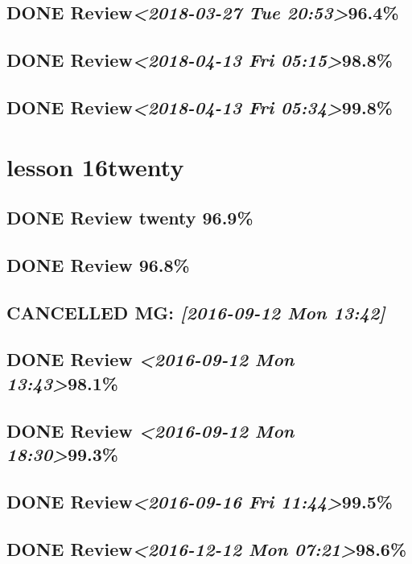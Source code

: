 \documentclass[11pt]{ctexart}
\begin{document}
\subsection{{\bfseries\sffamily DONE} Review\textit{<2018-03-27 Tue 20:53>}96.4\%}
\label{sec:org4cd9278}
\subsection{{\bfseries\sffamily DONE} Review\textit{<2018-04-13 Fri 05:15>}98.8\%}
\label{sec:org86f1db8}
\subsection{{\bfseries\sffamily DONE} Review\textit{<2018-04-13 Fri 05:34>}99.8\%}
\label{sec:orgc51c8cb}
\section{lesson 16twenty}
\label{sec:org872481e}
\subsection{{\bfseries\sffamily DONE} Review twenty 96.9\%}
\label{sec:orgdfd9cdf}
\subsection{{\bfseries\sffamily DONE} Review 96.8\%}
\label{sec:orgfef3785}
\subsection{{\bfseries\sffamily CANCELLED} MG: \textit{[2016-09-12 Mon 13:42]}}
\label{sec:org3ffd778}
\subsection{{\bfseries\sffamily DONE} Review \textit{<2016-09-12 Mon 13:43>}98.1\%}
\label{sec:org676de24}
\subsection{{\bfseries\sffamily DONE} Review \textit{<2016-09-12 Mon 18:30>}99.3\%}
\label{sec:org667511d}
\subsection{{\bfseries\sffamily DONE} Review\textit{<2016-09-16 Fri 11:44>}99.5\%}
\label{sec:org255e702}
\subsection{{\bfseries\sffamily DONE} Review\textit{<2016-12-12 Mon 07:21>}98.6\%}
\label{sec:org3050548}
\end{document}
